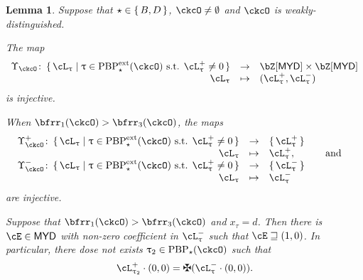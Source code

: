 \documentclass[12pt,a4paper]{amsart}
\newcommand{\pr}{\mathrm{pr}}
\def\MYD{{\mathsf{MYD}}}
\numberwithin{equation}{section}
\newtheorem{lem}[thm]{Lemma}
\theoremstyle{remark}
\def\PBPes{\mathrm{PBP}^{\mathrm{ext}}_{\star}}
\def\pUpsilon{\Upsilon^+}
\def\nUpsilon{\Upsilon^-}
\def\PBP{\mathrm{PBP}}
\begin{document}
\begin{lem}\label{lem:BD3}
Suppose that $\star \in \set{B,D}$, $\ckcO \neq \emptyset$ and $\ckcO$ is weakly-distinguished.
\begin{enuma}
    \item The map
    \begin{equation}\label{eq:up}
      \begin{array}{rcl}
        \Upsilon_{\ckcO} \colon \set{\ac_{\uptau}|\uptau\in \PBPes(\ckcO)
        \text{ s.t. } \pac{\uptau}\neq 0 }
        & \rightarrow &  \bZ[\MYD]\times \bZ[\MYD] \\ %
        \ac_{\uptau} &\mapsto & (\pac{\uptau},\nac{\uptau})
      \end{array}
    \end{equation}
    is injective.
  \item When $\bfrr_{1}(\ckcO)> \bfrr_{3}(\ckcO)$, the maps
    \[
      \begin{array}{rcl}
        \pUpsilon_{\ckcO} \colon \set{\ac_{\uptau}|\uptau\in \PBPes(\ckcO)
        \text{ s.t. } \pac{\uptau}\neq 0 } &\rightarrow  & \set{\pac{\uptau}}\\
       \ac_{\uptau} & \mapsto & \pac{\uptau},\qquad \AND\\
        \nUpsilon_{\ckcO} \colon \set{\ac_{\uptau}|\uptau\in \PBPes(\ckcO)
        \text{ s.t. } \pac{\uptau}\neq 0} &\rightarrow & \set{\nac{\uptau}}\\
       \ac_{\uptau} &\mapsto & \nac{\uptau}
     \end{array}
   \]
    are injective.
    \item Suppose that $\bfrr_{1}(\ckcO)> \bfrr_{3}(\ckcO)$ and $x_{\tau}=d$.
    Then there is $\cE\in \MYD$ with non-zero coefficient in $\nac{\uptau}$ such that $\cE\sqsupseteq (1,0)$.
    In particular, there dose not exists $\uptau_2\in \PBP_\star(\ckcO)$ such that
    \begin{equation}\label{eq:pnac}
     \pac{\uptau_2} \cdot (0,0) = \maltese (\nac{\uptau}\cdot (0,0)).
    \end{equation}
  \end{enuma}
\end{lem}
\end{document}
